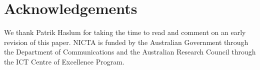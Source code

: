 \section{Acknowledgements}
\label{sec::ack}
We thank Patrik Haslum for taking the time to read and comment on 
an early revision of this paper.
NICTA is funded by the Australian Government through the Department of
Communications and the Australian Research Council through the ICT Centre of
Excellence Program.
